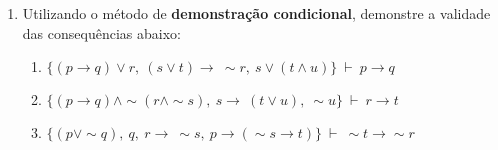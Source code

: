 \documentclass[12pt, a4paper,final]{article}
\begin{document}
\begin{enumerate}
\begin{enumerate}









 
  
\end{enumerate}


 \item Utilizando o m\'etodo de {\bf demonstra\c c\~ao condicional}, demonstre a validade das consequ\^encias abaixo:
 
\begin{enumerate}


\item $\{(p \rightarrow q) \vee r, ~ (s \vee t) \rightarrow ~ \sim r,   ~ s \vee (t \wedge u) \} ~\vdash~ p \rightarrow q $ 



\item $\{(p \rightarrow q) \wedge \sim(r \wedge \sim s), ~ s \rightarrow ~  (t \vee u), ~ \sim u \} ~\vdash~ r \rightarrow t $ 
 
 
\item $\{(p \vee \sim q),~ q,  ~ r \rightarrow ~ \sim s,~
p \rightarrow (\sim s \rightarrow t) \} ~\vdash~ \sim t \rightarrow \sim r $ 
 

\end{enumerate}
\end{enumerate}
\end{document}
